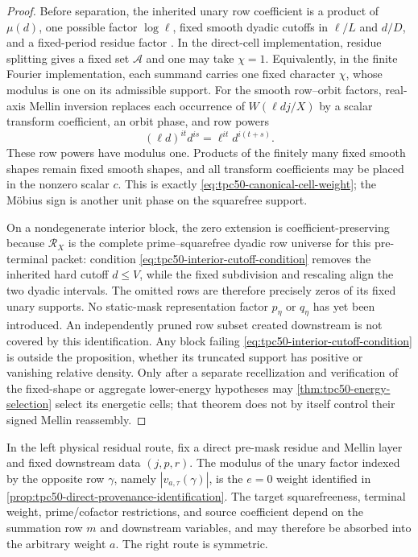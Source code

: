 \begin{proof}
Before separation, the inherited unary row coefficient is a product of
\(\mu(d)\), one possible factor \(\log\ell\), fixed smooth dyadic
cutoffs in \(\ell/L\) and \(d/D\), and a fixed-period residue factor
\citep{WangTPC25,WangTPC36}.  In the direct-cell implementation, residue
splitting gives a fixed set \(\mathcal A\) and one may take \(\chi=1\).
Equivalently, in the finite Fourier implementation, each summand carries
one fixed character \(\chi\), whose modulus is one on its admissible
support.
For the smooth row--orbit factors, real-axis Mellin inversion replaces
each occurrence of \(W(\ell dj/X)\) by a scalar transform coefficient,
an orbit phase, and row powers
\[
 (\ell d)^{it}d^{is}
 =\ell^{it}d^{i(t+s)}.
\]
These row powers have modulus one.  Products of the finitely many fixed
smooth shapes remain fixed smooth shapes, and all transform
coefficients may be placed in the nonzero scalar \(c\).  This is exactly
\eqref{eq:tpc50-canonical-cell-weight}; the M\"obius sign is another
unit phase on the squarefree support.

On a nondegenerate interior block, the zero extension is
coefficient-preserving because \(\mathcal R_X\) is the complete
prime--squarefree dyadic row universe for this pre-terminal packet:
condition \eqref{eq:tpc50-interior-cutoff-condition} removes the
inherited hard cutoff \(d\leq V\), while the fixed subdivision and
rescaling align the two dyadic intervals.  The omitted rows are
therefore precisely zeros of its fixed unary supports.  No static-mask
representation factor
\(p_\eta\) or \(q_\eta\) has yet been introduced.  An independently
pruned row subset created downstream is not covered by this
identification.  Any block failing
\eqref{eq:tpc50-interior-cutoff-condition} is outside the proposition,
whether its truncated support has positive or vanishing relative
density.  Only after a separate recellization and verification of the
fixed-shape or aggregate lower-energy hypotheses may
\cref{thm:tpc50-energy-selection} select its energetic cells; that
theorem does not by itself control their signed Mellin reassembly.
\end{proof}

\begin{corollary}
\label{cor:tpc50-downstream-factor-location}
In the left physical residual route, fix a direct pre-mask residue and
Mellin layer and fixed downstream data \((j,p,r)\).  The modulus of the
unary factor indexed by the opposite row \(\gamma\), namely
\(|v_{a,\tau}(\gamma)|\), is the \(e=0\) weight identified in
\cref{prop:tpc50-direct-provenance-identification}.  The target
squarefreeness, terminal weight, prime/cofactor restrictions, and
source coefficient depend on the summation row \(m\) and downstream
variables, and may therefore be absorbed into the arbitrary weight
\(a\).  The right route is symmetric.
\end{corollary}


